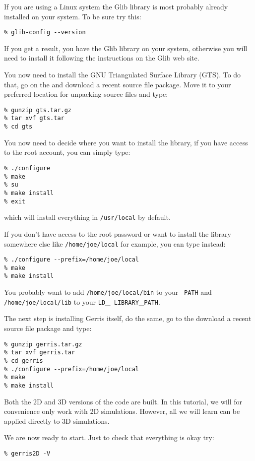 \documentclass[a4paper]{article}
\begin{document}
If you are using a Linux system the Glib library is most probably
already installed on your system. To be sure try this:
\begin{verbatim}
% glib-config --version
\end{verbatim}
If you get a result, you have the Glib library on your system,
otherwise you will need to install it following the instructions on
the Glib web site.

You now need to install the {\sc GNU} Triangulated Surface Library
({\sc GTS}). To do that, go on the  and download a recent source file
package. Move it to your preferred location for unpacking source files
and type:
\begin{verbatim}
% gunzip gts.tar.gz
% tar xvf gts.tar
% cd gts
\end{verbatim}
You now need to decide where you want to install the library, if you
have access to the root account, you can simply type:
\begin{verbatim}
% ./configure
% make
% su
% make install
% exit
\end{verbatim}
which will install everything in {\tt /usr/local} by default.

If you don't have access to the root password or want to install the
library somewhere else like {\tt /home/joe/local} for example, you can 
type instead:
\begin{verbatim}
% ./configure --prefix=/home/joe/local
% make
% make install
\end{verbatim}
You probably want to add {\tt /home/joe/local/bin} to your {\tt
PATH} and {\tt /home/joe/local/lib} to your {\tt LD}\_{\tt
LIBRARY}\_{\tt PATH}.

The next step is installing Gerris itself, do the same, go to the
 download a recent source file
package and type:
\begin{verbatim}
% gunzip gerris.tar.gz
% tar xvf gerris.tar
% cd gerris
% ./configure --prefix=/home/joe/local
% make
% make install
\end{verbatim}
Both the 2D and 3D versions of the code are built. In this tutorial,
we will for convenience only work with 2D simulations. However, all we
will learn can be applied directly to 3D simulations.

We are now ready to start. Just to check that everything is okay try:
\begin{verbatim}
% gerris2D -V
\end{verbatim}
\end{document}
